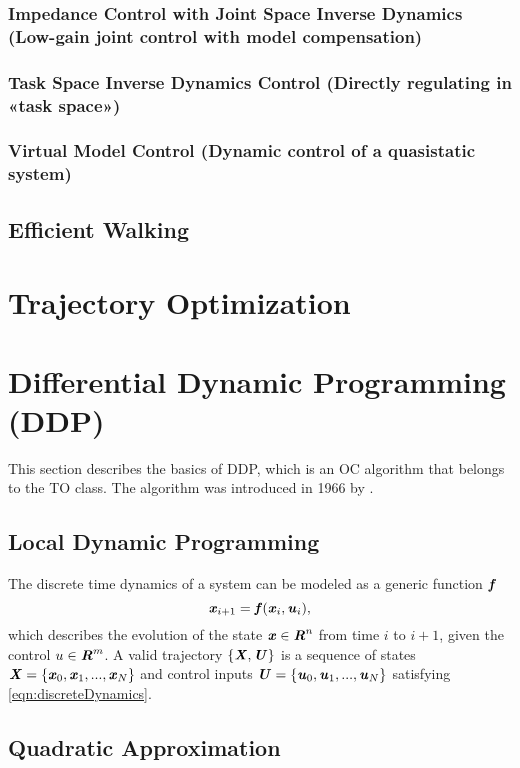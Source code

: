 \subsubsection{Impedance Control with Joint Space Inverse Dynamics (Low-gain joint control with model compensation)}
\subsubsection{Task Space Inverse Dynamics Control (Directly regulating in «task space»)}
\subsubsection{Virtual Model Control (Dynamic control of a quasistatic system)}
\subsection{Efficient Walking}

\section{Trajectory Optimization}

\section{Differential Dynamic Programming (DDP)}
This section describes the basics of DDP, which is an \gls{OC} algorithm that belongs to the \gls{TO} class. The algorithm was introduced in 1966 by \citeauthor{MAYNE1966} \citep{MAYNE1966}.
\subsection{Local Dynamic Programming}
The discrete time dynamics of a system can be modeled as a generic function $\bm{\mathit{f}}$
\begin{equation}\label{eqn:discreteDynamics}
\bm{\mathit{x}}_{i+1}=\bm{\mathit{f}}(\bm{\mathit{x}}_i,\bm{\mathit{u}}_i), 
\end{equation}
which describes the evolution of the state $\bm{\mathit{x}}\in \bm{\mathit{R}}^n$ from time $i$ to $i+1$, given the control $u\in \bm{\mathit{R}}^m$. A valid trajectory $\{\bm{\mathit{X}}, \bm{\mathit{U}}\}$ is a sequence of states $\bm{\mathit{X}}=\{\bm{\mathit{x}}_0, \bm{\mathit{x}}_1, ..., \bm{\mathit{x}}_N\}$ and control inputs $\bm{\mathit{U}}=\{\bm{\mathit{u}}_0, \bm{\mathit{u}}_1, ..., \bm{\mathit{u}}_N\}$ satisfying \cref{eqn:discreteDynamics}.

\subsection{Quadratic Approximation}
